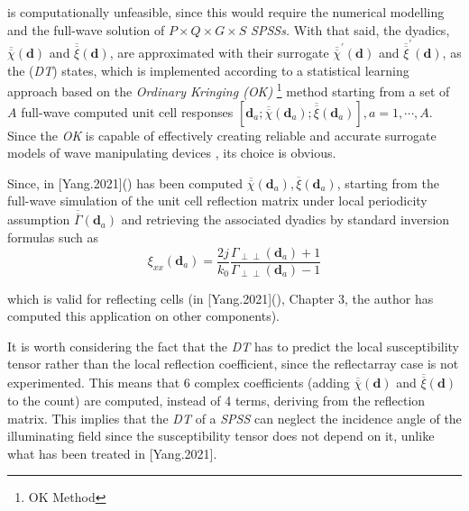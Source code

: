 is computationally unfeasible, since this would require the numerical
modelling and the full-wave solution of $P\times Q\times G\times S$
\emph{SPSSs.} With that said, the dyadics, $\overline{\overline{\chi}}(\mathbf{d})$
and $\overline{\overline{\xi}}(\mathbf{d})$, are approximated with
their surrogate $\overline{\overline{\chi}}^{\prime}(\mathbf{d})$
and $\overline{\overline{\xi}}^{\prime}(\mathbf{d})$, as the (\emph{DT})
states, which is implemented according to a statistical learning approach
based on the \emph{Ordinary Kringing (OK)}%
\footnote{OK Method%
}{\let\thefootnote\relax{}}
\emph{}method starting from a set of $A$ full-wave computed unit
cell responses $[\mathbf{d}_{a};\overline{\overline{\chi}}(\mathbf{d}_{a});\overline{\overline{\xi}}(\mathbf{d}_{a})],a=1,\cdots,A$.
Since the \emph{OK} is capable of effectively creating reliable and
accurate surrogate models of wave manipulating devices , its choice
is obvious. 

Since, in {[}Yang.2021{]}(\cite{Yang:2021}) has been computed $\overline{\overline{\chi}}(\mathbf{d}_{a}),\overline{\xi}(\mathbf{d}_{a})$,
starting from the full-wave simulation of the unit cell reflection
matrix under local periodicity assumption $\overline{\overline{\Gamma}}(\mathbf{d}_{a})$
and retrieving the associated dyadics by standard inversion formulas
such as\begin{equation}
\xi_{xx}(\mathbf{d}_{a})=\frac{2j}{k_{0}}\frac{\Gamma_{\perp\perp}(\mathbf{d}_{a})+1}{\Gamma_{\perp\perp}(\mathbf{d}_{a})-1}\label{eq:24}\end{equation}


which is valid for reflecting cells (in {[}Yang.2021{]}(\cite{Yang:2021}),
Chapter 3, the author has computed this application on other components).

It is worth considering the fact that the \emph{DT} has to predict
the local susceptibility tensor rather than the local reflection coefficient,
since the reflectarray case is not experimented. This means that 6
complex coefficients (adding $\overline{\overline{\chi}}(\mathbf{d})$
and $\overline{\overline{\xi}}(\mathbf{d})$ to the count) are computed,
instead of 4 terms, deriving from the reflection matrix. This implies
that the \emph{DT} of a \emph{SPSS} can neglect the incidence angle
of the illuminating field since the susceptibility tensor does not
depend on it, unlike what has been treated in {[}Yang.2021{]}\cite{Yang:2021}.

